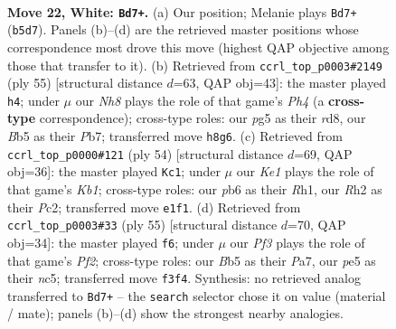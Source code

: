 \documentclass[11pt]{article}
\begin{document}
\clearpage

\begin{figure}[p]\centering
\begin{subfigure}{0.46\textwidth}\centering
\resizebox{\linewidth}{!}{%
\newchessgame
\chessboard[
  setfen={rnk3nN/8/1p6/pB1Rpbpp/8/b4P1P/P1p3PR/4K3 w - - 0 22},
  showmover=false,
  pgfstyle=straightmove, color=movearrow, markmove={b5-d7}
]}
\caption{}
\end{subfigure}\hfill
\begin{subfigure}{0.46\textwidth}\centering
\resizebox{\linewidth}{!}{%
\newchessgame
\chessboard[
  setfen={3R4/1p2Bpbk/4p3/1r5p/pP2P1p1/8/P4PPP/1K6 b - - 0 28},
  showmover=false,
  pgfstyle=straightmove, color=movearrow, markmove={h5-h4}
]}
\caption{}
\end{subfigure}
\\[4pt]
\begin{subfigure}{0.46\textwidth}\centering
\resizebox{\linewidth}{!}{%
\newchessgame
\chessboard[
  setfen={3k2r1/5pp1/Bpb1p3/2p4p/P3P2P/1P2BPb1/2P5/1K5R w - - 0 28},
  showmover=false,
  pgfstyle=straightmove, color=movearrow, markmove={b1-c1}
]}
\caption{}
\end{subfigure}\hfill
\begin{subfigure}{0.46\textwidth}\centering
\resizebox{\linewidth}{!}{%
\newchessgame
\chessboard[
  setfen={4k3/p1r2p1p/B5p1/2N1p3/1P1n1PbP/2R3P1/P5K1/8 b - - 0 28},
  showmover=false,
  pgfstyle=straightmove, color=movearrow, markmove={f7-f6}
]}
\caption{}
\end{subfigure}
\caption{\textbf{Move 22, White: \texttt{Bd7+}.} (a) Our position; Melanie plays \texttt{Bd7+} (\texttt{b5d7}). Panels (b)--(d) are the retrieved master positions whose correspondence most drove this move (highest QAP objective among those that transfer to it). (b) Retrieved from \texttt{ccrl\_top\_p0003\#2149} (ply 55) [structural distance $d$=63, QAP obj=43]: the master played \texttt{h4}; under $\mu$ our \emph{Nh8} plays the role of that game's \emph{Ph4} (a \textbf{cross-type} correspondence); cross-type roles: our \emph{p}g5 as their \emph{r}d8, our \emph{B}b5 as their \emph{P}b7; transferred move \texttt{h8g6}. (c) Retrieved from \texttt{ccrl\_top\_p0000\#121} (ply 54) [structural distance $d$=69, QAP obj=36]: the master played \texttt{Kc1}; under $\mu$ our \emph{Ke1} plays the role of that game's \emph{Kb1}; cross-type roles: our \emph{p}b6 as their \emph{R}h1, our \emph{R}h2 as their \emph{P}c2; transferred move \texttt{e1f1}. (d) Retrieved from \texttt{ccrl\_top\_p0003\#33} (ply 55) [structural distance $d$=70, QAP obj=34]: the master played \texttt{f6}; under $\mu$ our \emph{Pf3} plays the role of that game's \emph{Pf2}; cross-type roles: our \emph{B}b5 as their \emph{P}a7, our \emph{p}e5 as their \emph{n}c5; transferred move \texttt{f3f4}. Synthesis: no retrieved analog transferred to \texttt{Bd7+} -- the \texttt{search} selector chose it on value (material / mate); panels (b)--(d) show the strongest nearby analogies.}
\label{fig:thought-m42}
\end{figure}
\end{document}

